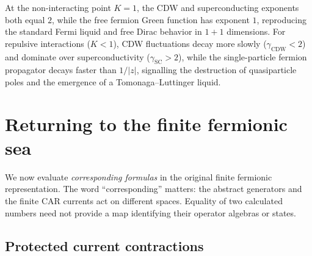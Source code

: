 \begin{table}[ht]
\centering
\caption{The Operator Exponent Dictionary across physical regimes.}
\label{tab:ch19-exponent-dictionary}
\renewcommand{\arraystretch}{1.3}
\end{table}

At the non-interacting point $K = 1$, the CDW and superconducting exponents both equal $2$,
while the free fermion Green function has exponent $1$, reproducing the standard Fermi liquid
and free Dirac behavior in $1+1$ dimensions.  For repulsive interactions ($K < 1$), CDW fluctuations
decay more slowly ($\gamma_{\mathrm{CDW}} < 2$) and dominate over superconductivity ($\gamma_{\mathrm{SC}} > 2$),
while the single-particle fermion propagator decays faster than $1/|z|$, signalling the destruction
of quasiparticle poles and the emergence of a Tomonaga--Luttinger liquid.

\section{Returning to the finite fermionic sea}
\label{sec:ch19-finite-comparison}

We now evaluate \emph{corresponding formulas} in the original finite
fermionic representation.  The word ``corresponding'' matters: the
abstract generators and the finite CAR currents act on different
spaces.  Equality of two calculated numbers need not provide a map
identifying their operator algebras or states.

\subsection*{Protected current contractions}

